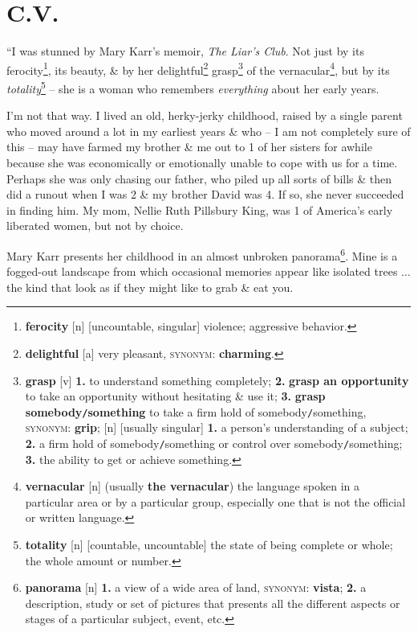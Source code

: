 \documentclass[oneside]{book}
\numberwithin{equation}{section}
\begin{document}

\section{C.V.}
``I was stunned by Mary Karr's memoir, \textit{The Liar's Club}. Not just by its ferocity\footnote{\textbf{ferocity} [n] [uncountable, singular] violence; aggressive behavior.}, its beauty, \& by her delightful\footnote{\textbf{delightful} [a] very pleasant, \textsc{synonym}: \textbf{charming}.} grasp\footnote{\textbf{grasp} [v] \textbf{1.} to understand something completely; \textbf{2.} \textbf{grasp an opportunity} to take an opportunity without hesitating \& use it; \textbf{3.} \textbf{grasp somebody\texttt{/}something} to take a firm hold of somebody\texttt{/}something, \textsc{synonym}: \textbf{grip}; [n] [usually singular] \textbf{1.} a person's understanding of a subject; \textbf{2.} a firm hold of somebody\texttt{/}something or control over somebody\texttt{/}something; \textbf{3.} the ability to get or achieve something.} of the vernacular\footnote{\textbf{vernacular} [n] (usually \textbf{the vernacular}) the language spoken in a particular area or by a particular group, especially one that is not the official or written language.}, but by its \textit{totality}\footnote{\textbf{totality} [n] [countable, uncountable] the state of being complete or whole; the whole amount or number.} -- she is a woman who remembers \textit{everything} about her early years.

I'm not that way. I lived an old, herky-jerky childhood, raised by a single parent who moved around a lot in my earliest years \& who -- I am not completely sure of this -- may have farmed my brother \& me out to 1 of her sisters for awhile because she was economically or emotionally unable to cope with us for a time. Perhaps she was only chasing our father, who piled up all sorts of bills \& then did a runout when I was 2 \& my brother David was 4. If so, she never succeeded in finding him. My mom, Nellie Ruth Pillsbury King, was 1 of America's early liberated women, but not by choice.

Mary Karr presents her childhood in an almost unbroken panorama\footnote{\textbf{panorama} [n] \textbf{1.} a view of a wide area of land, \textsc{synonym}: \textbf{vista}; \textbf{2.} a description, study or set of pictures that presents all the different aspects or stages of a particular subject, event, etc.}. Mine is a fogged-out landscape from which occasional memories appear like isolated trees $\ldots$ the kind that look as if they might like to grab \& eat you.
\end{document}
